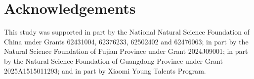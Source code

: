 \documentclass[10pt,twocolumn,letterpaper]{article}
\begin{document}
\section*{Acknowledgements}
This study was supported in part by the National Natural Science Foundation of China under Grants 62431004, 62376233, 62502402 and 62476063; in part by the Natural Science Foundation of Fujian Province under Grant 2024J09001; in part by the Natural Science Foundation of Guangdong Province under Grant 2025A1515011293; and in part by Xiaomi Young Talents Program.



{
    \small
    
    
}

% 



% 
\end{document}
